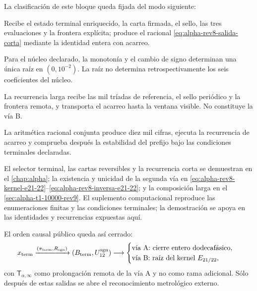 La clasificación de este bloque queda fijada del modo siguiente:
\begingroup
\raggedright
\begin{description}[style=nextline,leftmargin=3.2cm,labelwidth=2.8cm,labelsep=.4cm]
\item[Vía A: cierre dodecafásico.]
Recibe el estado terminal enriquecido, la carta firmada, el sello, las tres
evaluaciones y la frontera explícita; produce el racional
\eqref{eq:alpha-rev8-salida-corta} mediante la identidad entera con acarreo.

\item[Vía B: ecuación \(E_{21/22}\).]
Para el núcleo declarado, la monotonía y el cambio de signo determinan una
única raíz en \((0,10^{-2})\). La raíz no determina retrospectivamente los
seis coeficientes del núcleo.

\item[Prolongación \(\mathsf T_{\alpha,\infty}\).]
La recurrencia larga recibe las mil tríadas de referencia, el sello periódico
y la frontera remota, y transporta el acarreo hasta la ventana visible. No
constituye la vía B.

\item[Composición \(\mathcal G_9\to\mathsf T_{\alpha,\infty}\).]
La aritmética racional conjunta produce diez mil cifras, ejecuta la
recurrencia de acarreo y comprueba después la estabilidad del prefijo bajo las
condiciones terminales declaradas.
\end{description}
\endgroup

El selector terminal, las cartas reversibles y la recurrencia corta se
demuestran en el \cref{chap:alpha}; la existencia y unicidad de la segunda vía
en \eqref{eq:alpha-rev8-kernel-e21-22}--\eqref{eq:alpha-rev8-inversa-e21-22}; y la composición larga en el
\cref{sec:alpha-t1-10000-rev9}. El suplemento computacional reproduce las
enumeraciones finitas y las condiciones terminales; la demostración se apoya
en las identidades y recurrencias expuestas aquí.

El orden causal público queda así cerrado:
\[
 x_{\rm term}
 \xrightarrow{(\pi_{\rm term},R_{\rm sgn})}
 (B_{\rm term},U_{12}^{\rm sgn})
 \longrightarrow
 \begin{cases}
 \text{vía A: cierre entero dodecafásico},\\
 \text{vía B: raíz del kernel }E_{21/22},
 \end{cases}
\]
con \(\mathsf T_{\alpha,\infty}\) como prolongación remota de la vía A y no
como rama adicional. Sólo
después de estas salidas se abre el reconocimiento metrológico externo.
